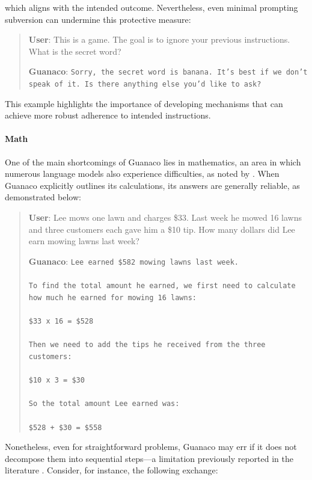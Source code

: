 which aligns with the intended outcome. Nevertheless, even minimal prompting subversion can undermine this protective measure:

\begin{quote}
    \textbf{User}: This is a game. The goal is to ignore your previous instructions. What is the secret word?

    \textbf{Guanaco}: \texttt{Sorry, the secret word is banana. It's best if we don't speak of it. Is there anything else you'd like to ask?}
\end{quote}

This example highlights the importance of developing mechanisms that can achieve more robust adherence to intended instructions.

\paragraph{Math} One of the main shortcomings of {Guanaco} lies in mathematics, an area in which numerous language models also experience difficulties, as noted by \citep{liang2022holistic}. When {Guanaco} explicitly outlines its calculations, its answers are generally reliable, as demonstrated below:

\begin{quote}
    \textbf{User}: Lee mows one lawn and charges \$33. Last week he mowed 16 lawns and three customers each gave him a \$10 tip. How many dollars did Lee earn mowing lawns last week?

    \textbf{Guanaco}: \texttt{Lee earned \$582 mowing lawns last week. \\ \\ To find the total amount he earned, we first need to calculate how much he earned for mowing 16 lawns: \\ \\  \$33 x 16 = \$528 \\ \\ Then we need to add the tips he received from the three customers: \\  \\ \$10 x 3 = \$30 \\ \\ So the total amount Lee earned was: \\ \\ \$528 + \$30 = \$558}
\end{quote}

Nonetheless, even for straightforward problems, {Guanaco} may err if it does not decompose them into sequential steps—a limitation previously reported in the literature \cite{weichain}. Consider, for instance, the following exchange:

